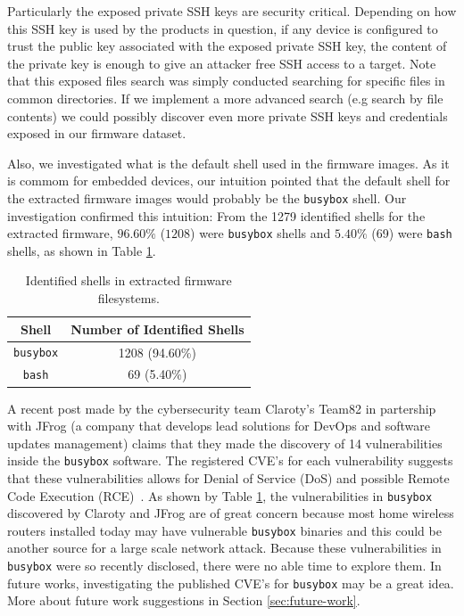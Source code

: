 Particularly the exposed private SSH keys are security critical. Depending on how this SSH key is used by the products in question, if any device is configured to trust the public key associated with the exposed private SSH key, the content of the private key is enough to give an attacker free SSH access to a target. Note that this exposed files search was simply conducted searching for specific files in common directories. If we implement a more advanced search (e.g search by file contents) we could possibly discover even more private SSH keys and credentials exposed in our firmware dataset.

Also, we investigated what is the default shell used in the firmware images. As it is commom for embedded devices, our intuition pointed that the default shell for the extracted firmware images would probably be the {\tt busybox} shell. Our investigation confirmed this intuition: From the 1279 identified shells for the extracted firmware, $96.60\%$ ($1208$) were {\tt busybox} shells and $5.40\%$ (69) were {\tt bash} shells, as shown in Table \ref{tab:shell-count}.

\begin{table}[H]
\centering
\caption{Identified shells in extracted firmware filesystems.}
\begin{tabular}{cc}
\hline
\textbf{Shell} & \textbf{Number of Identified Shells} \\ \hline
{\tt busybox}        & 1208 (94.60\%)              \\
{\tt bash}           & 69 (5.40\%)                 \\ \hline
\end{tabular}
\label{tab:shell-count}
\end{table}

A recent post made by the cybersecurity team Claroty’s Team82 in partership with JFrog (a company that develops lead solutions for DevOps and software updates management) claims that they made the discovery of 14 vulnerabilities inside the {\tt busybox} software. The registered CVE's for each vulnerability suggests that these vulnerabilities allows for Denial of Service (DoS) and possible Remote Code Execution (RCE)~\cite{jfrog-busybox}. As shown by Table \ref{tab:shell-count}, the vulnerabilities in {\tt busybox} discovered by Claroty and JFrog are of great concern because most home wireless routers installed today may have vulnerable {\tt busybox} binaries and this could be another source for a large scale network attack. Because these vulnerabilities in {\tt busybox} were so recently disclosed, there were no able time to explore them. In future works, investigating the published CVE's for {\tt busybox} may be a great idea. More about future work suggestions in Section \ref{sec:future-work}.

